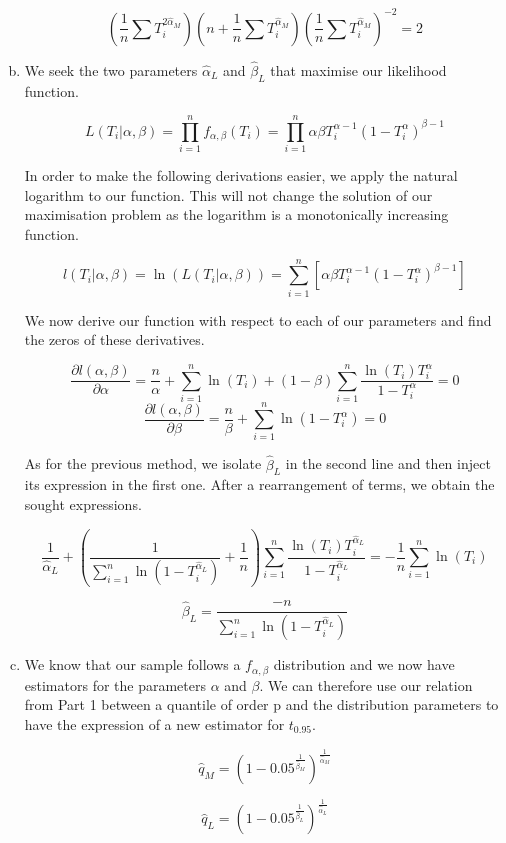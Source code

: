 \documentclass[a4paper]{article}
\begin{document}
\begin{enumerate}[(a)]
$$\left ( \frac{1}{n}\sum T_i^{2\hat{\alpha}_M} \right )  \left (n + \frac{1}{n}\sum T_i^{\hat{\alpha}_M} \right )  \left ( \frac{1}{n}\sum T_i^{\hat{\alpha}_M} \right )^{-2} = 2$$

\item We seek the two parameters $\hat{\alpha}_L$ and $\hat{\beta}_L$ that maximise our likelihood function. 

$$L(T_i|\alpha,\beta) = \prod_{i=1}^{n} f_{\alpha,\beta}(T_i) = \prod_{i=1}^{n} \alpha\beta T_i^{\alpha-1}(1-T_i^\alpha)^{\beta-1}$$

In order to make the following derivations easier, we apply the natural logarithm to our function. This will not change the solution of our maximisation problem as the logarithm is a monotonically increasing function.

$$l(T_i|\alpha,\beta) = \ln(L(T_i|\alpha,\beta)) = \sum_{i=1}^n \left [ \alpha\beta T_i^{\alpha-1}(1-T_i^\alpha)^{\beta-1} \right ]$$

We now derive our function with respect to each of our parameters and find the zeros of these derivatives.

$$ \frac{\partial l(\alpha, \beta)}{\partial \alpha} = \frac{n}{\alpha} + \sum_{i=1}^n \ln(T_i) + (1-\beta) \sum_{i=1}^{n} \frac{\ln(T_i) T_i^\alpha}{1-T_i^\alpha} = 0$$
$$ \frac{\partial l(\alpha, \beta)}{\partial \beta} = \frac{n}{\beta} + \sum_{i=1}^{n} \ln(1- T_i^\alpha)=0$$

As for the previous method, we isolate $\hat{\beta}_L$ in the second line and then inject its expression in the first one. After a rearrangement of terms, we obtain the sought expressions.

$$\frac{1}{\hat{\alpha}_L} + \left ( \frac{1}{\sum_{i=1}^n \ln(1-T_i^{\hat{\alpha}_L})} + \frac{1}{n}\right ) \sum_{i=1}^{n}\frac{\ln(T_i)T_i^{\hat{\alpha}_L}}{1-T_i^{\hat{\alpha}_L}} = - \frac{1}{n} \sum_{i=1}^n \ln(T_i)$$

$$\hat{\beta}_L = \frac{-n}{\sum_{i=1}^n \ln(1-T_i^{\hat{\alpha}_L})}$$

\item We know that our sample follows a $f_{\alpha,\beta}$ distribution and we now have estimators for the parameters $\alpha$ and $\beta$. We can therefore use our relation from Part 1 between a quantile of order p and the distribution parameters to have the expression of a new estimator for $t_{0.95}$.

$$ \hat{q}_M = (1-0.05^{\frac{1}{\hat{\beta}_M}})^{\frac{1}{\hat{\alpha}_M}}$$

$$ \hat{q}_L = (1-0.05^{\frac{1}{\hat{\beta}_L}})^{\frac{1}{\hat{\alpha}_L}}$$

\end{enumerate}
\end{document}
